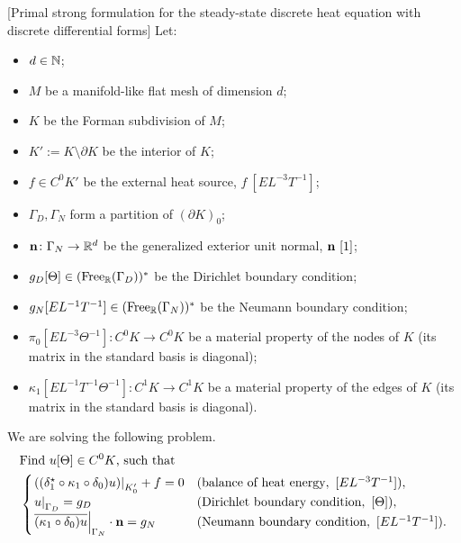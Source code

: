 \begin{formulation}
  \label{idec/diffusion/discrete/steady_state/primal_strong_with_normals-discussion}
  [Primal strong formulation for the steady-state discrete heat equation
    with discrete differential forms]
  Let:
  \begin{itemize}
    \item
      $d \in \mathbb{N}$;
    \item
      $M$ be a manifold-like flat mesh of dimension $d$;
    \item
      $K$ be the Forman subdivision of $M$;
    \item
      $K' := K \setminus \partial K$ be the interior of $K$;
    \item
      $f \in C^0 K'$ be the external heat source, $f\ [E L^{-3} T^{-1}]$;
    \item
      $\Gamma_D, \Gamma_N$ form a partition of $(\partial K)_0$;
    \item
      ${\bf n} \colon \Gamma_N \to \mathbb{R}^d$
      be the generalized exterior unit normal, ${\bf n}\ [1]$;
    \item
      $g_D [\Theta]\in ({\rm Free}_{\mathbb{R}}(\Gamma_D))^*$
      be the Dirichlet boundary condition;
    \item
      $g_N [E L^{-1} T^{-1}] \in ({\rm Free}_{\mathbb{R}}(\Gamma_N))^*$
      be the Neumann boundary condition;
    \item
      $\pi_0 [E L^{-3} \Theta^{-1}] \colon C^0 K \to C^0 K$ be a material
      property of the nodes of $K$
      (its matrix in the standard basis is diagonal);
    \item
      $\kappa_1 [E L^{-1} T^{-1} \Theta^{-1}] \colon C^1 K \to C^1 K$ be a
      material property of the edges of $K$
      (its matrix in the standard basis is diagonal).
  \end{itemize}
  We are solving the following problem.
  \begin{equation}
    \begin{split}
      & \text{Find $u [\Theta] \in C^0 K$, such that} \\
      &
      \begin{cases}
        \left. ((\delta_1^\star \circ \kappa_1 \circ \delta_0) u) \right|_{K'_0} + f
        = 0
        & (\text{balance of heat energy},\ [E L^{-3} T^{-1}]), \\
        \left. u \right|_{\Gamma_D} = g_D
        & (\text{Dirichlet boundary condition},\ [\Theta]), \\
        \left. \overline{(\kappa_1 \circ \delta_0) u} \right|_{\Gamma_N}
        \cdot {\bf n} = g_N
        & (\text{Neumann boundary condition},\ [E L^{-1} T^{-1}]).
      \end{cases}
    \end{split}
  \end{equation}
\end{formulation}
